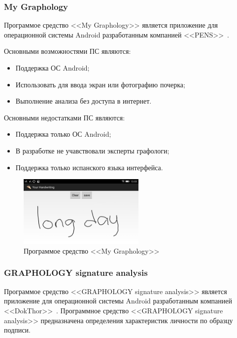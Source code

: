 \subsubsection{My Graphology}
\label{sub:domain:analogs:my_graphology}

Программое средство <<My Graphology>> является приложение для операционной системы Android разработанным компанией <<PENS>>~\cite{analogs_my_graphology}.

Основными возможностями ПС являются:
\begin{itemize}
  \item Поддержка ОС Android;
  \item Использовать для ввода экран или фотографию почерка;
  \item Выполнение анализа без доступа в интернет.
\end{itemize}

Основными недостатками ПС являются:
\begin{itemize}
  \item Поддержка только ОС Android;
  \item В разработке не учавствовали эксперты графологи;
  \item Поддержка только испанского языка интерфейса.
\end{itemize}

\begin{figure}[ht]
    \centering
    \label{fig:domain:analogs:my_graphology}
    \includegraphics[width=0.55\textwidth]{figures/analog_my_graphology.jpeg}
    \caption{Программое средство <<My Graphology>>}
\end{figure}

\subsubsection{GRAPHOLOGY signature analysis}
\label{sub:domain:analogs:graphology_sign_analysis}

Программое средство <<GRAPHOLOGY signature analysis>> является приложение для операционной системы Android разработанным компанией <<DokThor>>~\cite{analogs_graphology_sign_analysis}. Программное средство <<GRAPHOLOGY signature analysis>> предназначена определения характеристик личности по образцу подписи.

